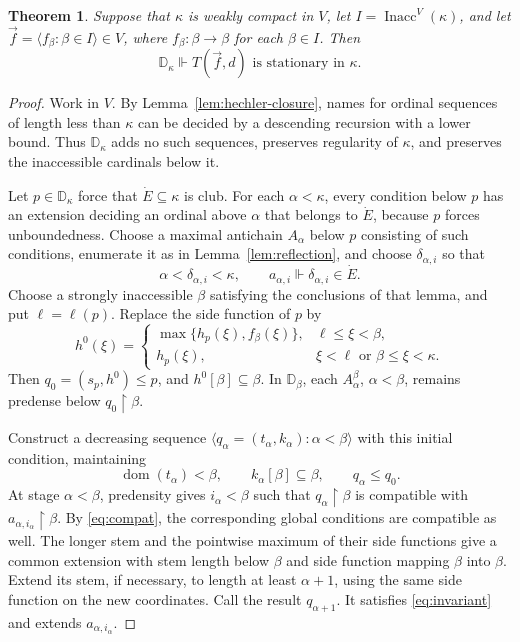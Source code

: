 \documentclass[10pt,a4paper]{amsart}
\newtheorem{theorem}{Theorem}[section]
\theoremstyle{definition}
\theoremstyle{remark}
\newcommand{\D}{\mathbb D}
\DeclareMathOperator{\dom}{dom}
\DeclareMathOperator{\Inacc}{Inacc}
\begin{document}
\begin{theorem}\label{thm:domination}
Suppose that \(\kappa\) is weakly compact in \(V\), let
\(I=\Inacc^V(\kappa)\), and let
\(\vec f=\langle f_\beta:\beta\in I\rangle\in V\), where
\(f_\beta:\beta\to\beta\) for each \(\beta\in I\). Then
\[
 \D_\kappa\Vdash
 T(\vec f,d)\text{ is stationary in }\kappa.
\]
\end{theorem}
\begin{proof}
Work in \(V\). By Lemma~\ref{lem:hechler-closure}, names for
ordinal sequences of length less than \(\kappa\) can be decided
by a descending recursion with a lower bound. Thus \(\D_\kappa\)
adds no such sequences, preserves regularity of \(\kappa\), and
preserves the inaccessible cardinals below it.

Let \(p\in\D_\kappa\) force that \(\dot E\subseteq\kappa\)
is club. For each \(\alpha<\kappa\), every condition below
\(p\) has an extension deciding an ordinal above \(\alpha\)
that belongs to \(\dot E\), because \(p\) forces unboundedness.
Choose a maximal antichain
\(A_\alpha\) below \(p\) consisting of such conditions, enumerate
it as in Lemma~\ref{lem:reflection}, and choose
\(\delta_{\alpha,i}\) so that
\[
 \alpha<\delta_{\alpha,i}<\kappa,\qquad
 a_{\alpha,i}\Vdash\delta_{\alpha,i}\in\dot E.
\]
Choose a strongly inaccessible \(\beta\) satisfying the conclusions
of that lemma, and put \(\ell=\ell(p)\). Replace the side function
of \(p\) by
\[
 h^0(\xi)=
 \begin{cases}
 \max\{h_p(\xi),f_\beta(\xi)\},&\ell\leq\xi<\beta,\\
 h_p(\xi),&\xi<\ell\text{ or }\beta\leq\xi<\kappa.
 \end{cases}
\]
Then \(q_0=(s_p,h^0)\leq p\), and
\(h^0[\beta]\subseteq\beta\). In \(\D_\beta\), each
\(A_\alpha^\beta\), \(\alpha<\beta\), remains predense below
\(q_0\restriction\beta\).

Construct a decreasing sequence
\(\langle q_\alpha=(t_\alpha,k_\alpha):\alpha<\beta\rangle\)
with this initial condition, maintaining
\begin{equation}\label{eq:invariant}
 \dom(t_\alpha)<\beta,\qquad
 k_\alpha[\beta]\subseteq\beta,\qquad q_\alpha\leq q_0.
\end{equation}
At stage \(\alpha<\beta\), predensity gives \(i_\alpha<\beta\)
such that \(q_\alpha\restriction\beta\) is compatible with
\(a_{\alpha,i_\alpha}\restriction\beta\). By
\eqref{eq:compat}, the corresponding global conditions are
compatible as well. The longer stem and the pointwise maximum of their
side functions give a common extension with stem length below
\(\beta\) and side function mapping \(\beta\) into \(\beta\).
Extend its stem, if necessary, to
length at least \(\alpha+1\), using the same side function on
the new coordinates. Call the result \(q_{\alpha+1}\). It
satisfies \eqref{eq:invariant} and extends
\(a_{\alpha,i_\alpha}\).


\end{proof}
\end{document}

